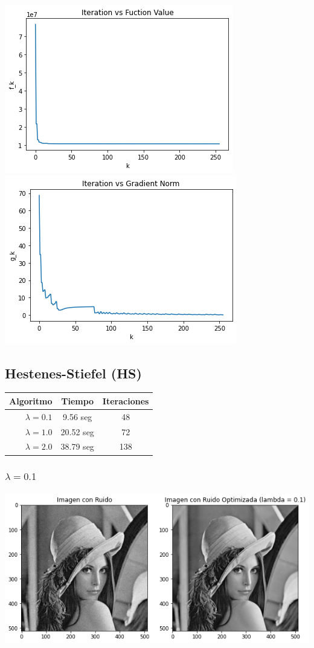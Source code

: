 \documentclass[11pt,letterpaper]{article}
\theoremstyle{definition}
\theoremstyle{definition}
\theoremstyle{definition}
\begin{document}
\begin{center}
	\includegraphics[width=0.6\linewidth]{graficas/pr/funcion_2}
	\includegraphics[width=0.6\linewidth]{graficas/pr/gradiente_2}
\end{center}

\subsection{Hestenes-Stiefel (HS)}
\begin{center}
	\begin{tabular}{rcc}
		\hline
		\hline
		Algoritmo          & Tiempo       & Iteraciones \\
		\hline
		\hline
		$ \lambda = 0.1 $ & 9.56 seg &    48          \\
		$ \lambda = 1.0 $ & 20.52 seg &   72          \\
		$ \lambda = 2.0 $ & 38.79 seg &   138         \\
		\hline
	\end{tabular}
\end{center}
\subsubsection{$ \lambda = 0.1 $}
\begin{center}
	\includegraphics[width=0.75\linewidth]{graficas/hs/optimizada_0}
\end{center}
\end{document}
